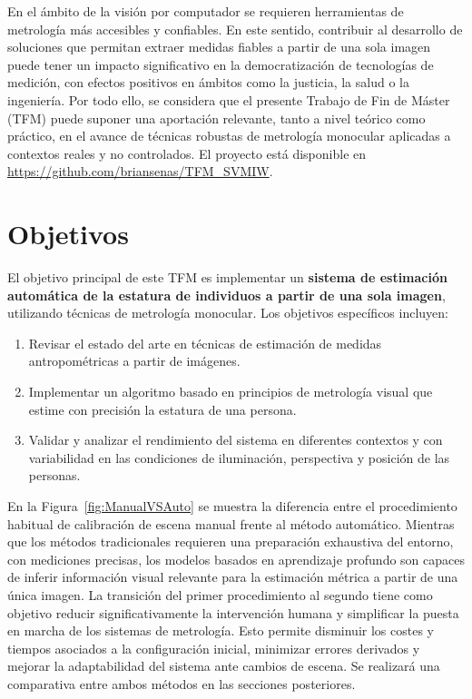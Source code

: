 En el ámbito de la visión por computador se requieren herramientas de metrología más accesibles y confiables.
En este sentido, contribuir al desarrollo de soluciones que permitan extraer medidas fiables a partir de una sola imagen puede tener un impacto significativo en la democratización de tecnologías de medición, con efectos positivos en ámbitos como la justicia, la salud o la ingeniería.
Por todo ello, se considera que el presente Trabajo de Fin de Máster (TFM) puede suponer una aportación relevante, tanto a nivel teórico como práctico, en el avance de técnicas robustas de metrología monocular aplicadas a contextos reales y no controlados.
El proyecto está disponible en \url{https://github.com/briansenas/TFM_SVMIW}.

\section{Objetivos}
El objetivo principal de este TFM es implementar
un \textbf{sistema de estimación automática de la estatura de individuos a partir de una sola imagen},
utilizando técnicas de metrología monocular. Los objetivos específicos incluyen:
\begin{enumerate}
    \item Revisar el estado del arte en técnicas de estimación de medidas antropométricas a partir de imágenes.
    \item Implementar un algoritmo basado en principios de metrología visual que estime con precisión la estatura de una persona.
    \item Validar y analizar el rendimiento del sistema en diferentes contextos y con variabilidad en las condiciones de iluminación, perspectiva y posición de las personas.
\end{enumerate}
En la Figura~\ref{fig:ManualVSAuto} se muestra la diferencia
entre el procedimiento habitual de calibración de escena manual frente al método automático.
Mientras que los métodos tradicionales requieren una preparación exhaustiva del entorno, con mediciones precisas,
los modelos basados en aprendizaje profundo son capaces de inferir información visual relevante para la estimación
métrica a partir de una única imagen. La transición del primer procedimiento al segundo tiene como objetivo reducir significativamente
la intervención humana y simplificar la puesta en marcha de los sistemas de metrología.
Esto permite disminuir los costes y tiempos asociados a la configuración inicial, minimizar errores derivados y mejorar
la adaptabilidad del sistema ante cambios de escena.
Se realizará una comparativa entre ambos métodos en las secciones posteriores.

